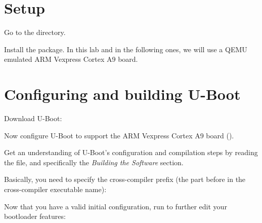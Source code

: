 
\section{Setup}

Go to the  directory.

Install the  package. In this lab and in the
following ones, we will use a QEMU emulated ARM Vexpress Cortex A9 board.

\section{Configuring and building U-Boot}

Download U-Boot:


Now configure U-Boot to support the ARM Vexpress Cortex A9 board
().

Get an understanding of U-Boot's configuration and compilation steps
by reading the  file, and specifically the {\em Building
the Software} section.

Basically, you need to specify the cross-compiler prefix
(the part before  in the cross-compiler executable name):

Now that you have a valid initial configuration, run 
to further edit your bootloader features:

